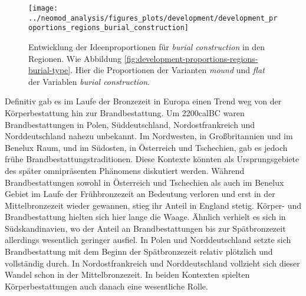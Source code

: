 \documentclass[openany,twoside,twocolumn]{book}
\begin{document}
\begin{figure}[!t]

{\centering \texttt{[image: ../neomod\_analysis/figures\_plots/development/development\_proportions\_regions\_burial\_construction]} 

}

\caption[Entwicklung der Ideenproportionen für \textit{burial construction} in den Regionen]{Entwicklung der Ideenproportionen für \textit{burial construction} in den Regionen. Wie Abbildung \ref{fig:development-proportions-regions-burial-type}. Hier die Proportionen der Varianten \textit{mound} und \textit{flat} der Variablen \textit{burial construction}.}\label{fig:development-proportions-regions-burial-construction}
\end{figure}

Definitiv gab es im Laufe der Bronzezeit in Europa einen Trend weg von
der Körperbestattung hin zur Brandbestattung. Um 2200calBC waren
Brandbestattungen in Polen, Süddeutschland, Nordostfrankreich und
Norddeutschland nahezu unbekannt. Im Nordwesten, in Großbritannien und
im Benelux Raum, und im Südosten, in Österreich und Tschechien, gab es
jedoch frühe Brandbestattungstraditionen. Diese Kontexte könnten als
Ursprungsgebiete des später omnipräsenten Phänomens diskutiert werden.
Während Brandbestattungen sowohl in Österreich und Tschechien als auch
im Benelux Gebiet im Laufe der Frühbronzezeit an Bedeutung verloren und
erst in der Mittelbronzezeit wieder gewannen, stieg ihr Anteil in
England stetig. Körper- und Brandbestattung hielten sich hier lange die
Waage. Ähnlich verhielt es sich in Südskandinavien, wo der Anteil an
Brandbestattungen bis zur Spätbronzezeit allerdings wesentlich geringer
ausfiel. In Polen und Norddeutschland setzte sich Brandbestattung mit
dem Beginn der Spätbronzezeit relativ plötzlich und vollständig durch.
In Nordostfrankreich und Norddeutschland vollzieht sich dieser Wandel
schon in der Mittelbronzezeit. In beiden Kontexten spielten
Körperbestattungen auch danach eine wesentliche Rolle.
\end{document}
